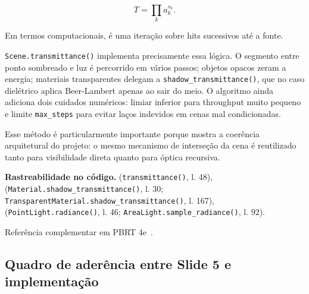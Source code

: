 \documentclass[portuguese]{sbcreviews-2025}%
\newcommand{\pbrtsec}[1]{PBRT 4e~\citep[Se\c{c}\~ao~#1]{pharr2023pbrt}}
\begin{document}
\[
T = \prod_k a_k^{s_k}.
\]

Em termos computacionais, é uma iteração sobre hits sucessivos até a fonte.

\texttt{Scene.transmittance()} implementa precisamente essa lógica. O segmento entre ponto sombreado e luz é percorrido em vários passos; objetos opacos zeram a energia; materiais transparentes delegam a \texttt{shadow\_transmittance()}, que no caso dielétrico aplica Beer-Lambert apenas ao sair do meio. O algoritmo ainda adiciona dois cuidados numéricos: limiar inferior para throughput muito pequeno e limite \texttt{max\_steps} para evitar laços indevidos em cenas mal condicionadas.

Esse método é particularmente importante porque mostra a coerência arquitetural do projeto: o mesmo mecanismo de interseção da cena é reutilizado tanto para visibilidade direta quanto para óptica recursiva.

\noindent\textbf{Rastreabilidade no código.}  (\texttt{transmittance()}, l. 48),  (\texttt{Material.shadow\_transmittance()}, l. 30; \texttt{TransparentMaterial.shadow\_transmittance()}, l. 167),  (\texttt{PointLight.radiance()}, l. 46; \texttt{AreaLight.sample\_radiance()}, l. 92).

Referência complementar em \pbrtsec{11.2}.

\subsection{Quadro de aderência entre Slide 5 e implementação}
\label{sec:slide5-quadro}
\end{document}
